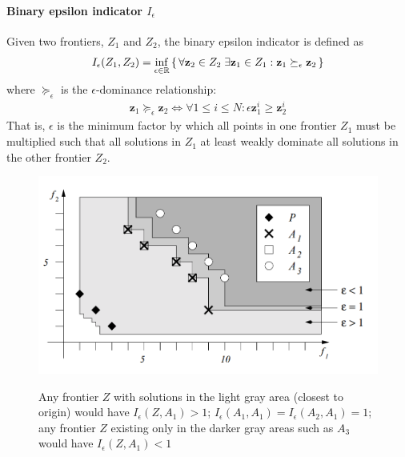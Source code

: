 \paragraph{Binary epsilon indicator $I_\epsilon$} Given two frontiers, $Z_1$ and $Z_2$, the binary epsilon indicator is defined as \cite{zitzler2003performance}
\begin{align}
I_\epsilon (Z_1,Z_2) = \inf_{\epsilon \in \mathbb{R}} \set{\forall \mathbf{z}_2 \in Z_2 \; \exists \mathbf{z}_1 \in Z_1 : \mathbf{z}_1 \succeq_\epsilon \mathbf{z}_2}
\end{align}
where $\succeq_\epsilon$ is the $\epsilon$-dominance relationship:
\begin{align}
\mathbf{z}_1 \succeq_\epsilon \mathbf{z}_2 \iff \forall 1 \le i \le N : \epsilon \mathbf{z}_1^i \ge \mathbf{z}_2^i
\end{align}
That is, $\epsilon$ is the minimum factor by which all points in one frontier $Z_1$ must be multiplied such that all solutions in $Z_1$ at least weakly dominate all solutions in the other frontier $Z_2$.
\begin{figure}
\centering
\includegraphics[width=.5\textwidth]{../images/BinaryEpsilonFigureLiftedFromZitzler}
\label{fig:binaryEpsilon}
\caption[Breakpoint values for the binary epsilon indicator $I_\epsilon$]{Any frontier $Z$ with solutions in the light gray area (closest to origin) would have $I_\epsilon (Z,A_1) > 1$; $I_\epsilon (A_1,A_1) = I_\epsilon (A_2,A_1) = 1$; any frontier $Z$ existing only in the darker gray areas such as $A_3$ would have $I_\epsilon (Z,A_1) < 1$}
\end{figure}

